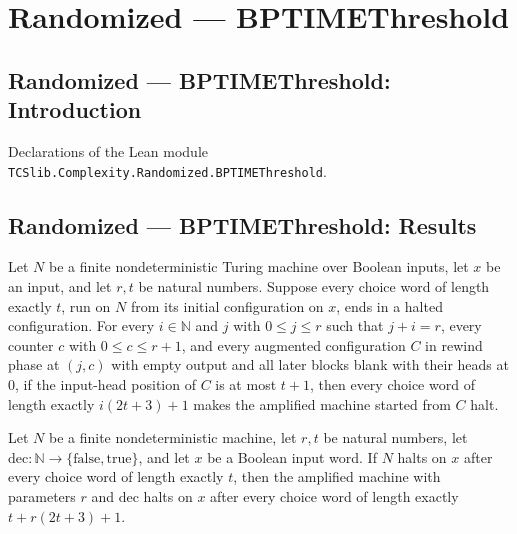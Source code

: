 \section{Randomized --- BPTIMEThreshold}
\subsection*{Randomized --- BPTIMEThreshold: Introduction}

Declarations of the Lean module \texttt{TCSlib.Complexity.Randomized.BPTIMEThreshold}.

\subsection*{Randomized --- BPTIMEThreshold: Results}

\begin{theorem}
\label{Randomized.Amplify.rewind_halts_pos}
\leanok
{}
Let $N$ be a finite nondeterministic Turing machine over Boolean inputs, let $x$ be an
input, and let $r,t$ be natural numbers. Suppose every choice word of length exactly
$t$, run on $N$ from its initial configuration on $x$, ends in a halted configuration.
For every $i\in\mathbb N$ and $j$ with $0\le j\le r$ such that $j+i=r$, every counter
$c$ with $0\le c\le r+1$, and every augmented configuration $C$ in rewind phase at
$(j,c)$ with empty output and all later blocks blank with their heads at $0$, if the
input-head position of $C$ is at most $t+1$, then every choice word of length exactly
$i(2t+3)+1$ makes the amplified machine started from $C$ halt.
\end{theorem}

\begin{theorem}
\label{Randomized.Amplify.amp_haltsWithin_pos}
\leanok
{}
Let $N$ be a finite nondeterministic machine, let $r,t$ be natural numbers, let
$\mathrm{dec}:\mathbb{N}\to\{\mathrm{false},\mathrm{true}\}$, and let $x$ be a Boolean
input word. If $N$ halts on $x$ after every choice word of length exactly $t$, then the
amplified machine with parameters $r$ and $\mathrm{dec}$ halts on $x$ after every choice
word of length exactly $t+r(2t+3)+1$.
\end{theorem}

